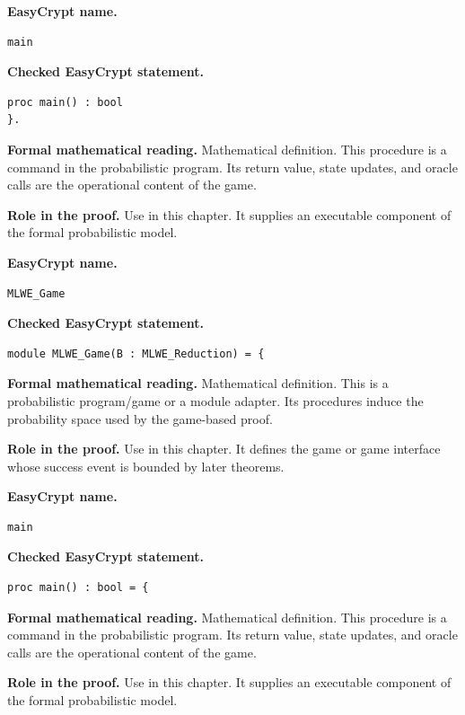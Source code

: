 \begin{formaldefinition}
\noindent\textbf{EasyCrypt name.}
\begin{lstlisting}[language=EasyCrypt,basicstyle=\ttfamily\scriptsize]
main
\end{lstlisting}
\noindent\textbf{Checked EasyCrypt statement.}
\begin{lstlisting}[language=EasyCrypt,basicstyle=\ttfamily\scriptsize]
proc main() : bool
}.
\end{lstlisting}
\noindent\textbf{Formal mathematical reading.}
Mathematical definition. This procedure is a command in the probabilistic program.  Its return value, state updates, and oracle calls are the operational content of the game.

\noindent\textbf{Role in the proof.}
Use in this chapter. It supplies an executable component of the formal probabilistic model.

\end{formaldefinition}

\begin{formaldefinition}
\noindent\textbf{EasyCrypt name.}
\begin{lstlisting}[language=EasyCrypt,basicstyle=\ttfamily\scriptsize]
MLWE_Game
\end{lstlisting}
\noindent\textbf{Checked EasyCrypt statement.}
\begin{lstlisting}[language=EasyCrypt,basicstyle=\ttfamily\scriptsize]
module MLWE_Game(B : MLWE_Reduction) = {
\end{lstlisting}
\noindent\textbf{Formal mathematical reading.}
Mathematical definition. This is a probabilistic program/game or a module adapter.  Its procedures induce the probability space used by the game-based proof.

\noindent\textbf{Role in the proof.}
Use in this chapter. It defines the game or game interface whose success event is bounded by later theorems.

\end{formaldefinition}

\begin{formaldefinition}
\noindent\textbf{EasyCrypt name.}
\begin{lstlisting}[language=EasyCrypt,basicstyle=\ttfamily\scriptsize]
main
\end{lstlisting}
\noindent\textbf{Checked EasyCrypt statement.}
\begin{lstlisting}[language=EasyCrypt,basicstyle=\ttfamily\scriptsize]
proc main() : bool = {
\end{lstlisting}
\noindent\textbf{Formal mathematical reading.}
Mathematical definition. This procedure is a command in the probabilistic program.  Its return value, state updates, and oracle calls are the operational content of the game.

\noindent\textbf{Role in the proof.}
Use in this chapter. It supplies an executable component of the formal probabilistic model.

\end{formaldefinition}


